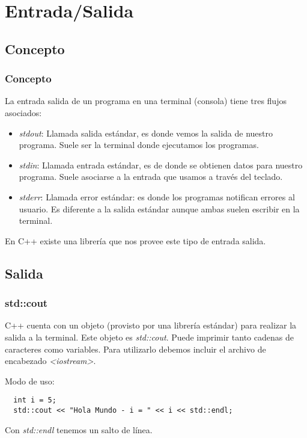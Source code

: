 \documentclass{beamer}
\begin{document}
\section{Entrada/Salida}

\subsection{Concepto}
\begin{frame}
\frametitle{Concepto}
La entrada salida de un programa en una terminal (consola) tiene tres flujos asociados:
\begin{itemize}
 \item \emph{stdout}: Llamada salida estándar, es donde vemos la salida de nuestro programa. Suele ser la terminal donde ejecutamos los programas.
 \item \emph{stdin}: Llamada entrada estándar, es de donde se obtienen datos para nuestro programa. Suele asociarse a la entrada que usamos a través del teclado.
 \item \emph{stderr}: Llamada error estándar: es donde los programas notifican errores al usuario. Es diferente a la salida estándar aunque ambas suelen escribir en la terminal.
\end{itemize}

En C++ existe una librería que nos provee este tipo de entrada salida.
\end{frame}

\subsection{Salida}
\begin{frame}[fragile]
\frametitle{std::cout}
C++ cuenta con un objeto (provisto por una librería estándar) para realizar la salida a la terminal.
Este objeto es \emph{std::cout}. Puede imprimir tanto cadenas de caracteres como variables.
Para utilizarlo debemos incluir el archivo de encabezado \emph{<iostream>}.

Modo de uso:
\begin{verbatim}
  int i = 5;
  std::cout << "Hola Mundo - i = " << i << std::endl;
\end{verbatim}

Con \emph{std::endl} tenemos un salto de línea.
\end{frame}
\end{document}
